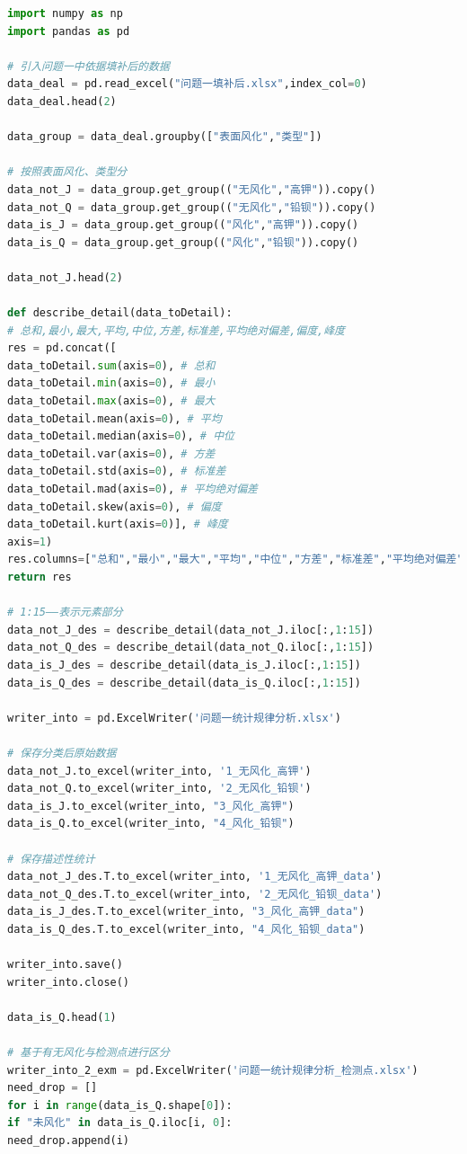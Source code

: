 \documentclass[withoutpreface,bwprint]{cumcmthesis} %
\begin{document}
\begin{appendices}
\begin{lstlisting}[language=python]
import numpy as np
import pandas as pd

# 引入问题一中依据填补后的数据
data_deal = pd.read_excel("问题一填补后.xlsx",index_col=0)
data_deal.head(2)

data_group = data_deal.groupby(["表面风化","类型"])

# 按照表面风化、类型分
data_not_J = data_group.get_group(("无风化","高钾")).copy()
data_not_Q = data_group.get_group(("无风化","铅钡")).copy()
data_is_J = data_group.get_group(("风化","高钾")).copy()
data_is_Q = data_group.get_group(("风化","铅钡")).copy()

data_not_J.head(2)

def describe_detail(data_toDetail):
# 总和,最小,最大,平均,中位,方差,标准差,平均绝对偏差,偏度,峰度
res = pd.concat([
data_toDetail.sum(axis=0), # 总和
data_toDetail.min(axis=0), # 最小
data_toDetail.max(axis=0), # 最大
data_toDetail.mean(axis=0), # 平均
data_toDetail.median(axis=0), # 中位
data_toDetail.var(axis=0), # 方差
data_toDetail.std(axis=0), # 标准差
data_toDetail.mad(axis=0), # 平均绝对偏差
data_toDetail.skew(axis=0), # 偏度
data_toDetail.kurt(axis=0)], # 峰度
axis=1)
res.columns=["总和","最小","最大","平均","中位","方差","标准差","平均绝对偏差","偏度","峰度"]
return res

# 1:15——表示元素部分
data_not_J_des = describe_detail(data_not_J.iloc[:,1:15])
data_not_Q_des = describe_detail(data_not_Q.iloc[:,1:15])
data_is_J_des = describe_detail(data_is_J.iloc[:,1:15])
data_is_Q_des = describe_detail(data_is_Q.iloc[:,1:15])

writer_into = pd.ExcelWriter('问题一统计规律分析.xlsx')

# 保存分类后原始数据
data_not_J.to_excel(writer_into, '1_无风化_高钾')
data_not_Q.to_excel(writer_into, '2_无风化_铅钡')
data_is_J.to_excel(writer_into, "3_风化_高钾")
data_is_Q.to_excel(writer_into, "4_风化_铅钡")

# 保存描述性统计
data_not_J_des.T.to_excel(writer_into, '1_无风化_高钾_data')
data_not_Q_des.T.to_excel(writer_into, '2_无风化_铅钡_data')
data_is_J_des.T.to_excel(writer_into, "3_风化_高钾_data")
data_is_Q_des.T.to_excel(writer_into, "4_风化_铅钡_data")

writer_into.save()
writer_into.close()

data_is_Q.head(1)

# 基于有无风化与检测点进行区分
writer_into_2_exm = pd.ExcelWriter('问题一统计规律分析_检测点.xlsx')
need_drop = []
for i in range(data_is_Q.shape[0]):
if "未风化" in data_is_Q.iloc[i, 0]:
need_drop.append(i)


\end{lstlisting}
\end{appendices}
\end{document}
